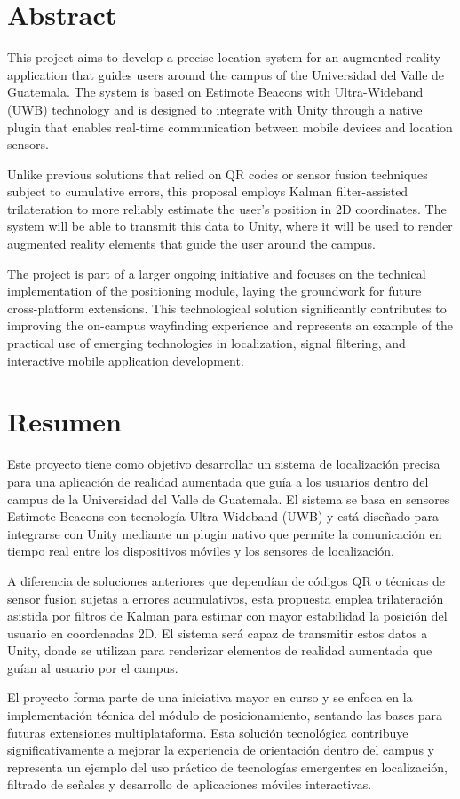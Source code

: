 \section{Abstract}
{\justify This project aims to develop a precise location system for an augmented reality application that guides users around the campus of the Universidad del Valle de Guatemala. The system is based on Estimote Beacons with Ultra-Wideband (UWB) technology and is designed to integrate with Unity through a native plugin that enables real-time communication between mobile devices and location sensors.

Unlike previous solutions that relied on QR codes or sensor fusion techniques subject to cumulative errors, this proposal employs Kalman filter-assisted trilateration to more reliably estimate the user's position in 2D coordinates. The system will be able to transmit this data to Unity, where it will be used to render augmented reality elements that guide the user around the campus.

The project is part of a larger ongoing initiative and focuses on the technical implementation of the positioning module, laying the groundwork for future cross-platform extensions. This technological solution significantly contributes to improving the on-campus wayfinding experience and represents an example of the practical use of emerging technologies in localization, signal filtering, and interactive mobile application development.}
\newpage

\section{Resumen}
{\justify
Este proyecto tiene como objetivo desarrollar un sistema de localización precisa para una aplicación de realidad aumentada que guía a los usuarios dentro del campus de la Universidad del Valle de Guatemala. El sistema se basa en sensores Estimote Beacons con tecnología Ultra-Wideband (UWB) y está diseñado para integrarse con Unity mediante un plugin nativo que permite la comunicación en tiempo real entre los dispositivos móviles y los sensores de localización.

A diferencia de soluciones anteriores que dependían de códigos QR o técnicas de sensor fusion sujetas a errores acumulativos, esta propuesta emplea trilateración asistida por filtros de Kalman para estimar con mayor estabilidad la posición del usuario en coordenadas 2D. El sistema será capaz de transmitir estos datos a Unity, donde se utilizan para renderizar elementos de realidad aumentada que guían al usuario por el campus.

El proyecto forma parte de una iniciativa mayor en curso y se enfoca en la implementación técnica del módulo de posicionamiento, sentando las bases para futuras extensiones multiplataforma. Esta solución tecnológica contribuye significativamente a mejorar la experiencia de orientación dentro del campus y representa un ejemplo del uso práctico de tecnologías emergentes en localización, filtrado de señales y desarrollo de aplicaciones móviles interactivas.
}
\newpage